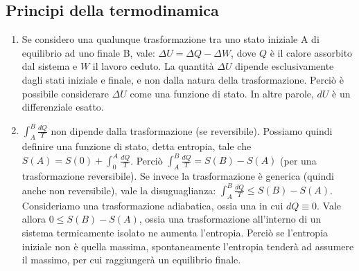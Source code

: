\documentclass[12pt]{article}
\begin{document}
\subsection{Principi della termodinamica}
\begin{enumerate}
    \item Se considero una qualunque trasformazione tra uno stato iniziale A di equilibrio ad uno finale B, vale: $\Delta U=\Delta Q-\Delta W$, dove $Q$ è il calore assorbito dal sistema e $W$ il lavoro ceduto. La quantità $\Delta U$ dipende esclusivamente dagli stati iniziale e finale, e non dalla natura della trasformazione. Perciò è possibile considerare $\Delta U$ come una funzione di stato. In altre parole, $dU$ è un differenziale esatto.
	\item $\int_{A}^{B}\frac{dQ}{T}$ non dipende dalla trasformazione (se reversibile). Possiamo quindi definire una funzione di stato, detta entropia, tale che $S\left(A\right)=S\left(0\right)+\int_{0}^{A}\frac{dQ}{T}$.
	Perciò $\int_{A}^{B}{\frac{dQ}{T}=S\left(B\right)-S(A)}$ (per una trasformazione reversibile). Se invece la trasformazione è generica (quindi anche non reversibile), vale la disuguaglianza: $\int_{A}^{B}{\frac{dQ}{T}\le S\left(B\right)-S(A)}$.
	Consideriamo una trasformazione adiabatica, ossia una in cui $dQ\equiv0$. Vale allora $0\leq S\left(B\right)-S(A)$, ossia una trasformazione all'interno di un sistema termicamente isolato ne aumenta l'entropia. Perciò se l'entropia iniziale non è quella massima, spontaneamente l'entropia tenderà ad assumere il massimo, per cui raggiungerà un equilibrio finale. 
\end{enumerate}
\end{document}
